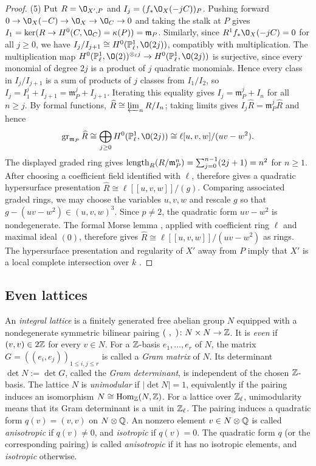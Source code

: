 \begin{proof}
(5) Put $R = \O_{X',P}$ and $I_j = (f_*\O_X(-jC))_P$.
Pushing forward $0\to\O_X(-C)\to\O_X\to\O_C\to0$ and taking the stalk at $P$ gives $I_1 = \ker(R\to H^0(C,\O_C)=\kappa(P)) = \mathfrak m_P$.
Similarly, since $R^1f_*\O_X(-jC) = 0$ for all $j\geq 0$, we have $I_j/I_{j+1}\cong H^0(\PP^1_\ell,\O(2j))$, compatibly with multiplication.
The multiplication map $H^0(\PP^1_\ell,\O(2))^{\otimes_\ell j}\to H^0(\PP^1_\ell,\O(2j))$ is surjective, since every monomial of degree $2j$ is a product of $j$ quadratic monomials.
Hence every class in $I_j/I_{j+1}$ is a sum of products of $j$ classes from $I_1/I_2$, so $I_j = I_1^j+I_{j+1} = \mathfrak m_P^j+I_{j+1}$.
Iterating this equality gives $I_j = \mathfrak m_P^j+I_n$ for all $n\geq j$.
By formal functions, $\widehat R\cong\varprojlim_n R/I_n$; taking limits gives $I_j\widehat R = \mathfrak m_P^j\widehat R$ and hence
\[
  \operatorname{gr}_{\mathfrak m_P}\widehat R
  \cong \bigoplus_{j\geq 0}H^0(\PP^1_\ell,\O(2j))
  \cong \ell[u,v,w]/(uv-w^2).
\]
The displayed graded ring gives $\operatorname{length}_R(R/\mathfrak m_P^n) = \sum_{j=0}^{n-1}(2j+1) = n^2$ for $n\geq 1$.
After choosing a coefficient field identified with $\ell$, \cite[Lemma~23.4]{Lip69} therefore gives a quadratic hypersurface presentation $\widehat R\cong\ell[[u,v,w]]/(g)$.
Comparing associated graded rings, we may choose the variables $u,v,w$ and rescale $g$ so that $g-(uv-w^2)\in(u,v,w)^3$.
Since $p\neq 2$, the quadratic form $uv-w^2$ is nondegenerate.
The formal Morse lemma \cite[Lemma~10.43]{Kol23}, applied with coefficient ring $\ell$ and maximal ideal $(0)$, therefore gives $\widehat R\cong\ell[[u,v,w]]/(uv-w^2)$ as rings.
The hypersurface presentation and regularity of $X'$ away from $P$ imply that $X'$ is a local complete intersection over $k$ \cite[Tag~]{Stacks}.
\end{proof}


\subsection{Even lattices}\label{subsec:even-lattices}
An \emph{integral lattice} is a finitely generated free abelian group $N$ equipped with a nondegenerate symmetric bilinear pairing $(\ ,\ )\colon N\times N\to\mathbb{Z}$.
It is \emph{even} if $(v,v)\in 2\mathbb{Z}$ for every $v\in N$.
For a $\mathbb{Z}$-basis $e_1,\ldots,e_r$ of $N$, the matrix $G = ((e_i,e_j))_{1\leq i,j\leq r}$ is called a \emph{Gram matrix} of $N$.
Its determinant $\det N := \det G$, called the \emph{Gram determinant}, is independent of the chosen $\mathbb{Z}$-basis.
The lattice $N$ is \emph{unimodular} if $\lvert\det N\rvert = 1$, equivalently if the pairing induces an isomorphism $N\cong\operatorname{Hom}_{\mathbb{Z}}(N,\mathbb{Z})$.
For a lattice over $\mathbb{Z}_\ell$, unimodularity means that its Gram determinant is a unit in $\mathbb{Z}_\ell$.
The pairing induces a quadratic form $q(v) = (v,v)$ on $N\otimes\mathbb{Q}$.
An nonzero element $v\in N\otimes\mathbb{Q}$ is called \emph{anisotropic} if $q(v)\neq 0$, and \emph{isotropic} if $q(v) = 0$.
The quadratic form $q$ (or the corresponding pairing) is called \emph{anisotropic} if it has no isotropic elements, and \emph{isotropic} otherwise. %



